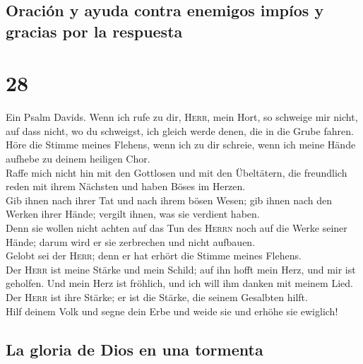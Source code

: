 \hypertarget{oraciuxf3n-y-ayuda-contra-enemigos-impuxedos-y-gracias-por-la-respuesta}{%
\subsection{Oración y ayuda contra enemigos impíos y gracias por la
respuesta}\label{oraciuxf3n-y-ayuda-contra-enemigos-impuxedos-y-gracias-por-la-respuesta}}

\hypertarget{section-27}{%
\section{28}\label{section-27}}

 Ein Psalm Davids. Wenn ich rufe zu dir, \textsc{Herr},
mein Hort, so schweige mir nicht, auf dass nicht, wo du schweigst, ich
gleich werde denen, die in die Grube fahren.\\
 Höre die Stimme meines Flehens, wenn ich zu dir schreie,
wenn ich meine Hände aufhebe zu deinem heiligen Chor.\\
 Raffe mich nicht hin mit den Gottlosen und mit den
Übeltätern, die freundlich reden mit ihrem Nächsten und haben Böses im
Herzen.\\
 Gib ihnen nach ihrer Tat und nach ihrem bösen Wesen; gib
ihnen nach den Werken ihrer Hände; vergilt ihnen, was sie verdient
haben.\\
 Denn sie wollen nicht achten auf das Tun des
\textsc{Herrn} noch auf die Werke seiner Hände; darum wird er sie
zerbrechen und nicht aufbauen.\\
 Gelobt sei der \textsc{Herr}; denn er hat erhört die
Stimme meines Flehens.\\
 Der \textsc{Herr} ist meine Stärke und mein Schild; auf
ihn hofft mein Herz, und mir ist geholfen. Und mein Herz ist fröhlich,
und ich will ihm danken mit meinem Lied.\\
 Der \textsc{Herr} ist ihre Stärke; er ist die Stärke, die
seinem Gesalbten hilft.\\
 Hilf deinem Volk und segne dein Erbe und weide sie und
erhöhe sie ewiglich!

\hypertarget{la-gloria-de-dios-en-una-tormenta}{%
\subsection{La gloria de Dios en una
tormenta}\label{la-gloria-de-dios-en-una-tormenta}}

